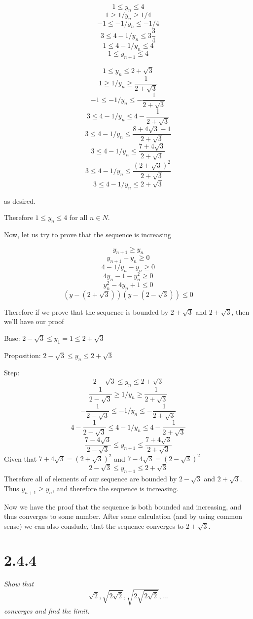 \documentclass[11pt,oneside,titlepage]{book}
\begin{document}
$$1 \leq y_n \leq 4$$
$$1 \geq 1/y_n \geq 1/4$$
$$-1 \leq -1/y_n \leq -1/4$$
$$3 \leq 4 - 1/y_n \leq 3 \frac{3}{4}$$
$$1 \leq 4 - 1/y_n \leq 4$$
$$1 \leq y_{n + 1} \leq 4$$


$$1 \leq y_n \leq 2 + \sqrt{3}$$
$$1 \geq 1/y_n \geq \frac{1}{2 + \sqrt{3}}$$
$$-1 \leq -1/y_n \leq -\frac{1}{2 + \sqrt{3}}$$
$$3 \leq 4 - 1/y_n \leq 4  -\frac{1}{2 + \sqrt{3}}$$
$$3 \leq 4 - 1/y_n \leq \frac{8 + 4 \sqrt{3} - 1}{2 + \sqrt{3}}$$
$$3 \leq 4 - 1/y_n \leq \frac{7 + 4 \sqrt{3}}{2 + \sqrt{3}}$$
$$3 \leq 4 - 1/y_n \leq \frac{(2 + \sqrt{3})^2}{2 + \sqrt{3}}$$
$$3 \leq 4 - 1/y_n \leq 2 + \sqrt{3}$$

as desired.

Therefore $1 \leq y_n \leq 4$ for all $n \in N$.

Now, let us try to prove that the sequence is increasing

$$y_{n + 1} \geq y_n $$
$$y_{n + 1} - y_n \geq 0 $$
$$4 - 1/y_n - y_n \geq 0 $$
$$4y_n - 1 - y_n^2 \geq 0 $$
$$y_n^2 - 4 y_n + 1 \leq 0 $$
$$(y - (2 + \sqrt{3}))(y - (2 - \sqrt{3})) \leq 0 $$

Therefore  if we prove that the sequence is bounded by $2 + \sqrt{3}$ and
$2 + \sqrt{3}$, then we'll have our proof

Base: $2 - \sqrt{3} \leq y_1 = 1 \leq 2 + \sqrt{3}$

Proposition: $2 - \sqrt{3} \leq y_n \leq 2 + \sqrt{3}$

Step:
$$2 - \sqrt{3} \leq y_n \leq 2 + \sqrt{3}$$
$$\frac{1}{2 - \sqrt{3}} \geq 1/y_n \geq \frac{1}{2 + \sqrt{3}}$$
$$-\frac{1}{2 - \sqrt{3}} \leq -1/y_n \leq - \frac{1}{2 + \sqrt{3}}$$
$$4 -\frac{1}{2 - \sqrt{3}} \leq 4  -1/y_n \leq 4 - \frac{1}{2 + \sqrt{3}}$$
$$\frac{7 - 4 \sqrt{3}}{2 - \sqrt{3}} \leq y_{n + 1} \leq \frac{7 + 4 \sqrt{3}}{2 + \sqrt{3}}$$
Given that $7 + 4 \sqrt{3} = (2 + \sqrt{3})^2$ and $7 - 4 \sqrt{3} = (2 - \sqrt{3})^2$ 
$$2 - \sqrt{3} \leq y_{n + 1} \leq 2 + \sqrt{3}$$
Therefore all of elements of our sequence are bounded by $2 - \sqrt{3}$ and
$2 + \sqrt{3}$. Thus $y_{n + 1} \geq y_n$, and therefore the sequence is increasing.

Now we have the proof that the sequence is both bounded and increasing, and thus
converges to some number. After some calculation (and by using common sense) we can
also conslude, that the sequence converges to $2 + \sqrt{3}$.

\section*{2.4.4}
\textit{Show that }
$$ \sqrt{2}, \sqrt{2 \sqrt{2}}, \sqrt{ 2 \sqrt{ 2 \sqrt{2}}}, ... $$
\textit{converges and find the limit.}
\end{document}
